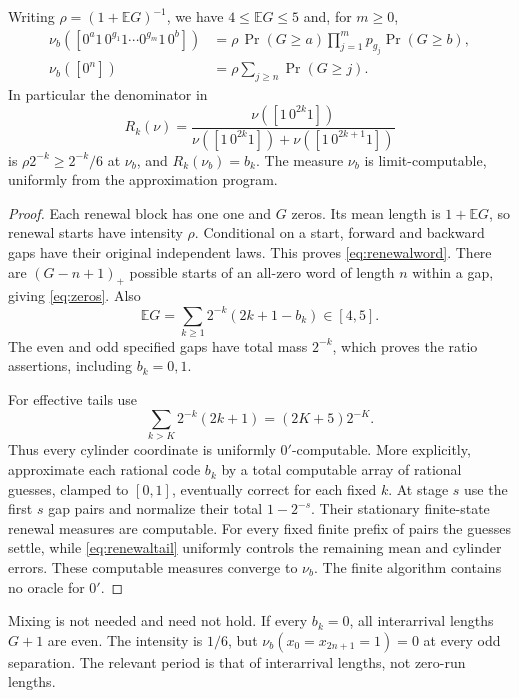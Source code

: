 \begin{lemma}\label{lem:renewal}
Writing $\rho=(1+\mathbb EG)^{-1}$, we have $4\leq\mathbb EG\leq5$
and, for $m\geq0$,
\begin{align}
 \nu_b([0^a1\,0^{g_1}1\cdots0^{g_m}1\,0^b])
   &=\rho\,\Pr(G\geq a)\prod_{j=1}^m p_{g_j}\Pr(G\geq b),
       \label{eq:renewalword}\\
 \nu_b([0^n])&=\rho\sum_{j\geq n}\Pr(G\geq j). \label{eq:zeros}
\end{align}
In particular the denominator in
\begin{equation}\label{eq:gapratio}
 R_k(\nu)=
 \frac{\nu([1\,0^{2k}1])}
 {\nu([1\,0^{2k}1])+\nu([1\,0^{2k+1}1])}
\end{equation}
is $\rho2^{-k}\geq2^{-k}/6$ at $\nu_b$, and
$R_k(\nu_b)=b_k$. The measure $\nu_b$ is limit-computable,
uniformly from the approximation program.
\end{lemma}
\begin{proof}
Each renewal block has one one and $G$ zeros. Its mean length is
$1+\mathbb EG$, so renewal starts have intensity $\rho$. Conditional
on a start, forward and backward gaps have their original independent
laws. This proves \eqref{eq:renewalword}. There are
$(G-n+1)_+$ possible starts of an all-zero word of length $n$ within
a gap, giving \eqref{eq:zeros}. Also
\[
 \mathbb EG=\sum_{k\geq1}2^{-k}(2k+1-b_k)\in[4,5].
\]
The even and odd specified gaps have total mass $2^{-k}$,
which proves the ratio assertions, including $b_k=0,1$.

For effective tails use
\begin{equation}\label{eq:renewaltail}
 \sum_{k>K}2^{-k}(2k+1)=(2K+5)2^{-K}.
\end{equation}
Thus every cylinder coordinate is uniformly $0'$-computable.
More explicitly, approximate each rational code $b_k$ by a total
computable array of rational guesses, clamped to $[0,1]$, eventually
correct for each fixed $k$. At stage $s$ use the first $s$ gap
pairs and normalize their total $1-2^{-s}$. Their stationary
finite-state renewal measures are computable. For every fixed
finite prefix of pairs the guesses settle, while
\eqref{eq:renewaltail} uniformly controls the remaining mean and
cylinder errors. These computable measures converge to $\nu_b$.
The finite algorithm contains no oracle for $0'$.
\end{proof}

Mixing is not needed and need not hold. If every $b_k=0$, all
interarrival lengths $G+1$ are even. The intensity is $1/6$, but
$\nu_b(x_0=x_{2n+1}=1)=0$ at every odd separation. The relevant
period is that of interarrival lengths, not zero-run lengths.

